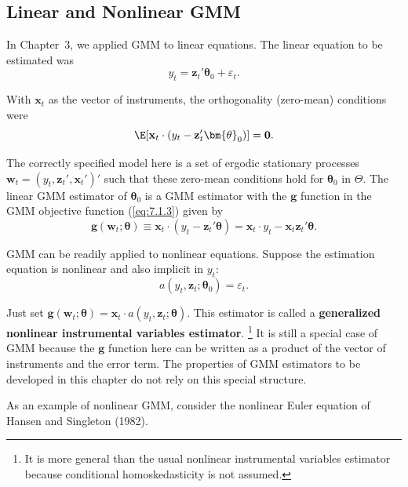 \subsection*{Linear and Nonlinear GMM}

In Chapter~3, we applied GMM to linear equations. The linear equation to be estimated was
\begin{equation}
\label{eq:7.1.21}
y_t = \mathbf{z}_t' \bm{\theta}_0 + \varepsilon_t.
\end{equation}

With $\mathbf{x}_t$ as the vector of instruments, the orthogonality (zero-mean) conditions were
\begin{equation}
\label{eq:7.1.22}
\E[\mathbf{x}_t \cdot (y_t - \mathbf{z}_t' \bm{\theta}_0)] = \mathbf{0}.
\end{equation}

The correctly specified model here is a set of ergodic stationary processes $\mathbf{w}_t = (y_t, \mathbf{z}_t', \mathbf{x}_t')'$ such that these zero-mean conditions hold for $\bm{\theta}_0$ in $\Theta$. The linear GMM estimator of $\bm{\theta}_0$ is a GMM estimator with the $\mathbf{g}$ function in the GMM objective function (\ref{eq:7.1.3}) given by
\begin{equation}
\label{eq:7.1.23}
\mathbf{g}(\mathbf{w}_t; \bm{\theta}) \equiv \mathbf{x}_t \cdot (y_t - \mathbf{z}_t' \bm{\theta}) = \mathbf{x}_t \cdot y_t - \mathbf{x}_t \mathbf{z}_t' \bm{\theta}.
\end{equation}

GMM can be readily applied to nonlinear equations. Suppose the estimation equation is nonlinear and also implicit in $y_t$:
\begin{equation}
\label{eq:7.1.24}
a(y_t, \mathbf{z}_t; \bm{\theta}_0) = \varepsilon_t.
\end{equation}

Just set $\mathbf{g}(\mathbf{w}_t; \bm{\theta}) = \mathbf{x}_t \cdot a(y_t, \mathbf{z}_t; \bm{\theta})$. This estimator is called a \textbf{generalized nonlinear instrumental variables estimator}.%
\footnote{It is more general than the usual nonlinear instrumental variables estimator because conditional homoskedasticity is not assumed.}
It is still a special case of GMM because the $\mathbf{g}$ function here can be written as a product of the vector of instruments and the error term. The properties of GMM estimators to be developed in this chapter do not rely on this special structure.

As an example of nonlinear GMM, consider the nonlinear Euler equation of Hansen and Singleton (1982).

